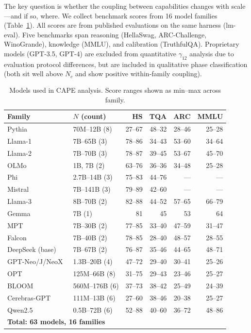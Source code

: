 \documentclass[11pt]{article}
\begin{document}
The key question is whether the coupling between capabilities changes with scale---and if so, where.
We collect benchmark scores from 16 model families (Table~\ref{tab:models}).
All scores are from published evaluations on the same harness (lm-eval).
Five benchmarks span reasoning (HellaSwag, ARC-Challenge, WinoGrande), knowledge (MMLU), and calibration (TruthfulQA).
Proprietary models (GPT-3.5, GPT-4) are excluded from quantitative $\gamma_{12}$ analysis due to evaluation protocol differences, but are included in qualitative phase classification (both sit well above $N_c$ and show positive within-family coupling).

\begin{table}[ht]
\centering\small
\caption{Models used in CAPE analysis. Score ranges shown as min--max across family.}
\label{tab:models}
\begin{tabular}{llrrrr}
\hline
Family & $N$ (count) & HS & TQA & ARC & MMLU \\
\hline
Pythia~\cite{biderman2023} & 70M--12B (8) & 27--67 & 48--32 & 28--46 & 25--28 \\
Llama-1 & 7B--65B (3) & 78--86 & 34--43 & 53--60 & 34--64 \\
Llama-2 & 7B--70B (3) & 78--87 & 39--45 & 53--67 & 45--70 \\
OLMo & 1B, 7B (2) & 63--76 & 36--36 & 34--48 & 25--28 \\
Phi & 2.7B--14B (3) & 75--83 & 44--76 & --- & --- \\
Mistral & 7B--141B (3) & 79--89 & 42--60 & --- & --- \\
Llama-3 & 8B--70B (2) & 82--88 & 44--52 & 57--65 & 66--79 \\
Gemma & 7B (1) & 81 & 45 & 53 & 64 \\
MPT & 7B--30B (2) & 77--85 & 33--40 & 47--59 & 31--47 \\
Falcon & 7B--40B (2) & 78--85 & 28--40 & 48--57 & 28--55 \\
DeepSeek (base) & 7B--67B (2) & 76--87 & 35--46 & 44--65 & 48--71 \\
GPT-Neo/J/NeoX~\cite{gptneo2021} & 1.3B--20B (4) & 47--72 & 29--40 & 30--41 & 25--26 \\
OPT~\cite{zhang2022opt} & 125M--66B (8) & 31--75 & 29--43 & 23--46 & 25--27 \\
BLOOM~\cite{bloom2022} & 560M--176B (6) & 37--73 & 38--42 & 25--49 & 24--39 \\
Cerebras-GPT & 111M--13B (6) & 27--60 & 38--46 & 20--38 & 25--27 \\
Qwen2.5 & 0.5B--72B (6) & 52--88 & 40--60 & 36--72 & 48--86 \\
\hline
\multicolumn{2}{l}{\textbf{Total: 63 models, 16 families}} \\
\hline
\end{tabular}
\end{table}
\end{document}
